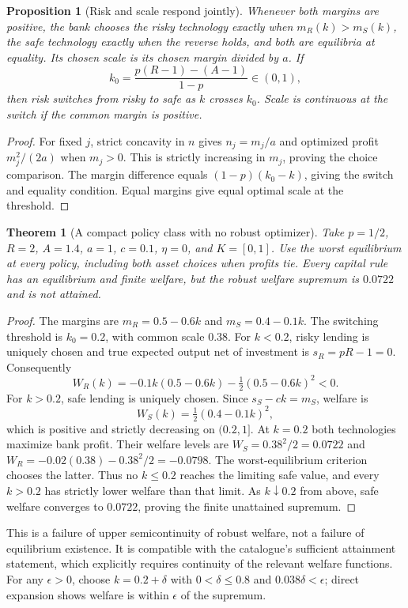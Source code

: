 \documentclass[11pt]{article}
\newtheorem{theorem}{Theorem}
\newtheorem{proposition}{Proposition}
\theoremstyle{definition}
\begin{document}
\begin{proposition}[Risk and scale respond jointly]
Whenever both margins are positive, the bank chooses the risky technology exactly when $m_R(k)>m_S(k)$, the safe technology exactly when the reverse holds, and both are equilibria at equality. Its chosen scale is its chosen margin divided by $a$. If
\[
 k_0=\frac{p(R-1)-(A-1)}{1-p}\in(0,1),
\]
then risk switches from risky to safe as $k$ crosses $k_0$. Scale is continuous at the switch if the common margin is positive.
\end{proposition}
\begin{proof}
For fixed $j$, strict concavity in $n$ gives $n_j=m_j/a$ and optimized profit $m_j^2/(2a)$ when $m_j>0$. This is strictly increasing in $m_j$, proving the choice comparison. The margin difference equals $(1-p)(k_0-k)$, giving the switch and equality condition. Equal margins give equal optimal scale at the threshold.
\end{proof}

\begin{theorem}[A compact policy class with no robust optimizer]
Take $p=1/2$, $R=2$, $A=1.4$, $a=1$, $c=0.1$, $\eta=0$, and $K=[0,1]$. Use the worst equilibrium at every policy, including both asset choices when profits tie. Every capital rule has an equilibrium and finite welfare, but the robust welfare supremum is $0.0722$ and is not attained.
\end{theorem}
\begin{proof}
The margins are $m_R=0.5-0.6k$ and $m_S=0.4-0.1k$. The switching threshold is $k_0=0.2$, with common scale $0.38$. For $k<0.2$, risky lending is uniquely chosen and true expected output net of investment is $s_R=pR-1=0$. Consequently
\[
 W_R(k)=-0.1k(0.5-0.6k)-\tfrac12(0.5-0.6k)^2<0.
\]
For $k>0.2$, safe lending is uniquely chosen. Since $s_S-ck=m_S$, welfare is
\[
 W_S(k)=\tfrac12(0.4-0.1k)^2,
\]
which is positive and strictly decreasing on $(0.2,1]$. At $k=0.2$ both technologies maximize bank profit. Their welfare levels are $W_S=0.38^2/2=0.0722$ and $W_R=-0.02(0.38)-0.38^2/2=-0.0798$. The worst-equilibrium criterion chooses the latter. Thus no $k\leq0.2$ reaches the limiting safe value, and every $k>0.2$ has strictly lower welfare than that limit. As $k\downarrow0.2$ from above, safe welfare converges to $0.0722$, proving the finite unattained supremum.
\end{proof}
This is a failure of upper semicontinuity of robust welfare, not a failure of equilibrium existence. It is compatible with the catalogue's sufficient attainment statement, which explicitly requires continuity of the relevant welfare functions. For any $\epsilon>0$, choose $k=0.2+\delta$ with $0<\delta\leq0.8$ and $0.038\delta<\epsilon$; direct expansion shows welfare is within $\epsilon$ of the supremum.
\end{document}
